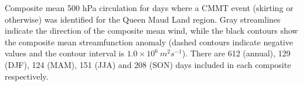 \label{fig:queen_maud}
Composite mean 500 hPa circulation for days where a CMMT event (skirting or otherwise) was identified for the Queen Maud Land region. Gray streamlines indicate the direction of the composite mean wind, while the black contours show the composite mean streamfunction anomaly (dashed contours indicate negative values and the contour interval is $1.0 \times 10^6 \: m^2 s^{-1}$). There are 612 (annual), 129 (DJF), 124 (MAM), 151 (JJA) and 208 (SON) days included in each composite respectively.